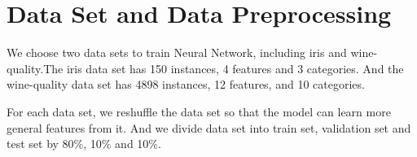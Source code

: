 \section{Data Set and Data Preprocessing}
We choose two data sets to train Neural Network, including iris and wine-quality.The iris data set has 150 instances, 4 features and 3 categories. And the wine-quality data set has 4898 instances, 12 features, and 10 categories.

For each data set, we reshuffle the data set so that the model can learn more general features from it. And we divide data set into train set, validation set and test set by 80\%, 10\% and 10\%.